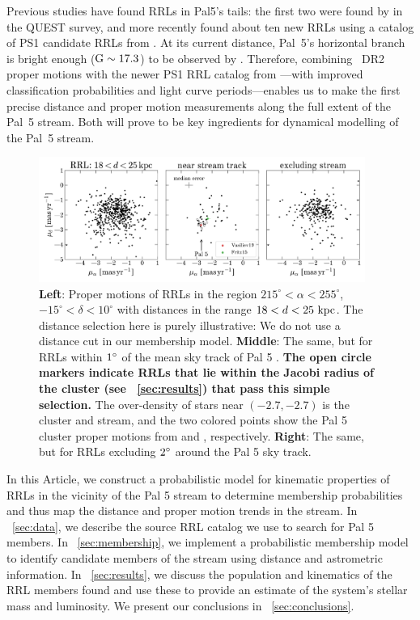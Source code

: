 \documentclass[twocolumn]{aastex63}
\newcommand{\changes}[1]{{\textbf{#1}}}
\begin{document}
Previous studies have found RRLs in Pal5's tails: the first two were found by \citet{Vivas:2001} in the QUEST survey, and more recently \citep{Ibata:2017} found about ten new RRLs using a catalog of PS1 candidate RRLs from \citet{Hernitschek:2016}. At its current distance, Pal~5's horizontal branch is bright enough (${\mathrm{G}}\sim17.3$) to be observed by \Gaia. Therefore, combining \Gaia~DR2 proper motions with the newer PS1 RRL catalog from \citet{Sesar:2017b}---with improved classification probabilities and light curve periods---enables us to make the first precise distance and proper motion measurements along the full extent of the Pal~5 stream. Both will prove to be key ingredients for dynamical modelling of the Pal~5 stream.

\begin{figure}[t!]
\begin{center}
\includegraphics[width=0.95\textwidth, trim=0 20px 0 0]{proper-motion.pdf}
\caption{\textbf{Left}: Proper motions of RRLs in the region $215^\circ < \alpha < 255^\circ$, $-15^\circ < \delta < 10^\circ$ with distances in the range $18 < d < 25~\mathrm{kpc}$.
The distance selection here is purely illustrative: We do not use a distance cut in our membership model.
\textbf{Middle}: The same, but for RRLs within $1\mbox{$^\circ$}$ of the mean sky track of Pal 5 \citep{Bonaca:2019}.
\changes{The open circle markers indicate RRLs that lie within the Jacobi radius of the cluster (see \sectionname~\ref{sec:results}) that pass this simple selection.}
The over-density of stars near $(-2.7, -2.7)$ is the cluster and stream, and the two colored points show the Pal 5 cluster proper motions from \citet{Vasiliev:2019} and \citet{Fritz:2015}, respectively.
\textbf{Right}: The same, but for RRLs excluding $2\mbox{$^\circ$}$ around the Pal 5 sky track.}
\label{fig:pm}
\end{center}
\end{figure}

In this Article, we construct a probabilistic model for kinematic properties of RRLs in the vicinity of the Pal 5 stream to determine membership probabilities and thus map the distance and proper motion trends in the stream.
In \sectionname~\ref{sec:data}, we describe the source RRL catalog we use to search for Pal 5 members.
In \sectionname~\ref{sec:membership}, we implement a probabilistic membership model to identify candidate members of the stream using distance and astrometric information.
In \sectionname~\ref{sec:results}, we discuss the population and kinematics of the RRL members found and use these to provide an estimate of the system's stellar mass and luminosity.
We present our conclusions in \sectionname~\ref{sec:conclusions}.
\end{document}
